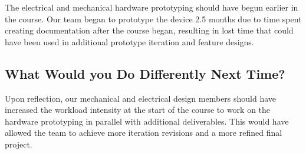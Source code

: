 \documentclass[12pt]{article}
\begin{document}

The electrical and mechanical hardware prototyping should have begun earlier in the course. Our team began to prototype the device 2.5 months due to time spent creating documentation after the course began, resulting in lost time that could have been used in additional prototype iteration and feature designs. 

\subsection{What Would you Do Differently Next Time?}


Upon reflection, our mechanical and electrical design members should have increased the workload intensity at the start of the course to work on the hardware prototyping in parallel with additional deliverables. This would have allowed the team to achieve more iteration revisions and a more refined final project. \\
\end{document}
